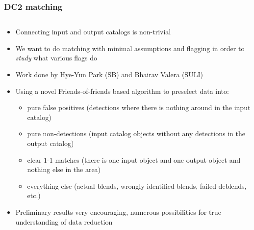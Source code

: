 \documentclass[aspectratio=169]{beamer}
\begin{document}
\begin{frame}
  \frametitle{DC2 matching}

  \begin{columns}
    \begin{column}{8cm}
      \begin{itemize}
        \scriptsize
      \item Connecting input and output catalogs is non-trivial
      
      \item We want to do matching with minimal assumptions and
        flagging in order to \emph{study} what various flags do

      \item Work done by Hye-Yun Park (SB) and Bhairav Valera (SULI)

      \item Using a novel Friends-of-friends based algorithm to
        preselect data into:
        \begin{itemize}
          \scriptsize
        \item  pure false positives (detections where
        there is nothing around in the input catalog)

      \item pure non-detections (input catalog objects without any
         detections in the output catalog)

      \item clear 1-1 matches (there is one input object and one
        output object and nothing else in the area)

      \item everything else (actual blends, wrongly identified blends,
        failed deblends, etc.)


        \end{itemize}
      \item Preliminary results very encouraging, numerous
        possibilities for true understanding of data reduction


\end{itemize}
\end{column}
\end{columns}
\end{frame}
\end{document}
